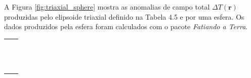 A Figura \ref{fig:triaxial_sphere} mostra as anomalias de campo total $\Delta T (\mathbf{r})$ produzidas pelo elipsoide triaxial definido na Tabela 4.5 e por uma esfera. Os dados produzidos pela esfera foram calculados com o pacote \textit{Fatiando a Terra}.
\newpage

\begin{table}[h!]
	\begin{center}
		\begin{tabular}{lc}
			
			&  \\
			& \\
			& \\
			& \\
			& \\
			& \\
			& \\
			& \\
			& \\
			& \\
			& \\
			& \\
			& \\
		\end{tabular}
	\end{center}
\end{table}

